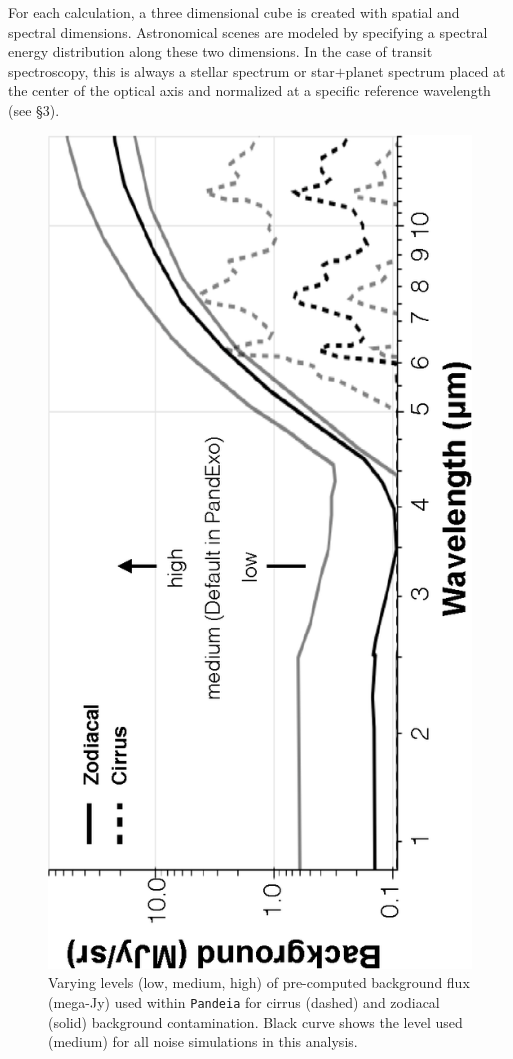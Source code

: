 \documentclass[iop]{emulateapj}
\begin{document}
For each calculation, a three dimensional cube is created with spatial
and spectral dimensions. Astronomical scenes are modeled by specifying a
spectral energy distribution along these two dimensions. In the case of 
transit spectroscopy, this is always a stellar spectrum or star$+$planet
spectrum placed at the center of the optical axis and normalized at a 
specific reference wavelength (see \S3). 
\begin{figure}[ht]
 \includegraphics[angle=270,origin=c,width=\linewidth]{fig1.eps}
\caption{Varying levels (low, medium, high) of pre-computed background flux (mega-Jy) used within \texttt{Pandeia} for cirrus (dashed) and zodiacal (solid) background contamination. Black curve shows the level used (medium) for all noise simulations in this analysis. 
\label{fig1}}
\end{figure}
\end{document}
